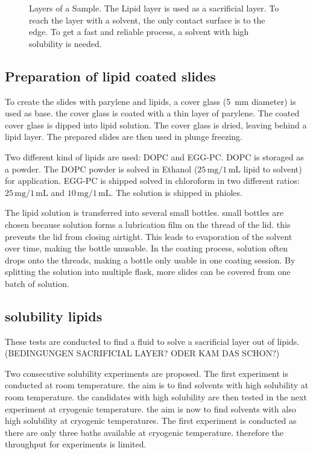 \begin{figure}[hbt!]
	\centering
	
	\caption{Layers of a Sample. The Lipid layer is used as a sacrificial layer. To reach the layer with a solvent, the only contact surface is to the edge. To get a fast and reliable process, a solvent with high solubility is needed.}
	\label{fig:sacrificial layer}
\end{figure}


\subsection{Preparation of lipid coated slides}

To create the slides with parylene and lipids, a cover glass (\SI{5}{\milli\meter} diameter) is used as base. the cover glass is coated with a thin layer of parylene. The coated cover glass is dipped into lipid solution. The cover glass is dried, leaving behind a lipid layer. The prepared slides are then used in plunge freezing.

Two different kind of lipids are used: DOPC and EGG-PC. DOPC is storaged as a powder. The DOPC powder is solved in Ethanol ($25\,\si{\milli\gram}/1\,\si{\milli\liter}$ lipid to solvent) for application. 
EGG-PC is shipped solved in chloroform in two different ratios: $25\,\si{\milli\gram}/1\,\si{\milli\liter}$ and $10\,\si{\milli\gram}/1\,\si{\milli\liter}$. The solution is shipped in phioles.

The lipid solution is transferred into several small bottles. small bottles are chosen because solution forms a lubrication film on the thread of the lid. this prevents the lid from closing airtight. This leads to evaporation of the solvent over time, making the bottle unusable. In the coating process, solution often drops onto the threads, making a bottle only usable in one coating session. By splitting the solution into multiple flask, more slides can be covered from one batch of solution.

\subsection{solubility lipids}

These tests are conducted to find a fluid to solve a sacrificial layer out of lipids. (BEDINGUNGEN SACRIFICIAL LAYER? ODER KAM DAS SCHON?)

Two consecutive solubility experiments are proposed. The first experiment is conducted at room temperature. the aim is to find solvents with high solubility at room temperature. the candidates with high solubility are then tested in the next experiment at cryogenic temperature. the aim is now to find solvents with also high solubility at cryogenic temperatures. The first experiment is conducted as there are only three baths available at cryogenic temperature. therefore the throughput for experiments is limited.

